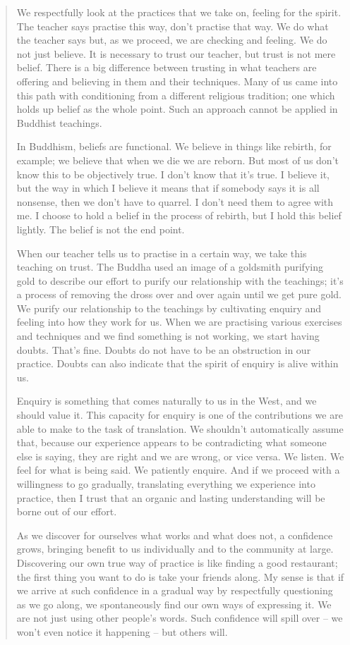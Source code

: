 \begin{quote}
We respectfully look at the practices that we take on, feeling for the
spirit. The teacher says practise this way, don't practise that way. We
do what the teacher says but, as we proceed, we are checking and
feeling. We do not just believe. It is necessary to trust our teacher,
but trust is not mere belief. There is a big difference between trusting
in what teachers are offering and believing in them and their
techniques. Many of us came into this path with conditioning from a
different religious tradition; one which holds up belief as the whole
point. Such an approach cannot be applied in Buddhist teachings.

In Buddhism, beliefs are functional. We believe in things like rebirth,
for example; we believe that when we die we are reborn. But most of us
don't know this to be objectively true. I don't know that it's true. I
believe it, but the way in which I believe it means that if somebody
says it is all nonsense, then we don't have to quarrel. I don't need
them to agree with me. I choose to hold a belief in the process of
rebirth, but I hold this belief lightly. The belief is not the end
point.

When our teacher tells us to practise in a certain way, we take this
teaching on trust. The Buddha used an image of a goldsmith purifying
gold to describe our effort to purify our relationship with the
teachings; it's a process of removing the dross over and over again
until we get pure gold. We purify our relationship to the teachings by
cultivating enquiry and feeling into how they work for us. When we are
practising various exercises and techniques and we find something is not
working, we start having doubts. That's fine. Doubts do not have to be
an obstruction in our practice. Doubts can also indicate that the spirit
of enquiry is alive within us.

Enquiry is something that comes naturally to us in the West, and we
should value it. This capacity for enquiry is one of the contributions
we are able to make to the task of translation. We shouldn't
automatically assume that, because our experience appears to be
contradicting what someone else is saying, they are right and we are
wrong, or vice versa. We listen. We feel for what is being said. We
patiently enquire. And if we proceed with a willingness to go gradually,
translating everything we experience into practice, then I trust that an
organic and lasting understanding will be borne out of our effort.

As we discover for ourselves what works and what does not, a confidence
grows, bringing benefit to us individually and to the community at
large. Discovering our own true way of practice is like finding a good
restaurant; the first thing you want to do is take your friends along.
My sense is that if we arrive at such confidence in a gradual way by
respectfully questioning as we go along, we spontaneously find our own
ways of expressing it. We are not just using other people's words. Such
confidence will spill over -- we won't even notice it happening -- but
others will.
\end{quote}

